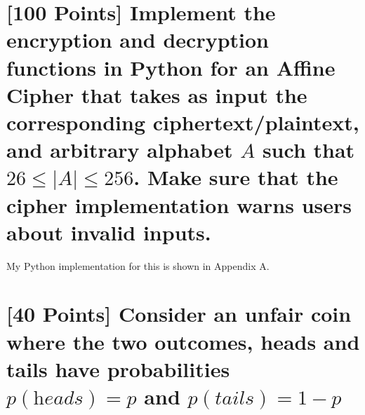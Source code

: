 \documentclass{article}
\begin{document}
    \section*{[100 Points] Implement the encryption and decryption functions in Python for an Affine Cipher that takes as input the corresponding ciphertext/plaintext, and  arbitrary alphabet $A$ such that  $26 \leq |A| \leq 256$. Make sure that the cipher implementation warns users about invalid inputs.}

My Python implementation for this is shown in Appendix A.

    \section*{[40 Points] Consider an unfair coin where the two outcomes, heads and tails have probabilities $p(\textit{heads})=p$ and $p(\textit{tails})=1-p$}
\end{document}
